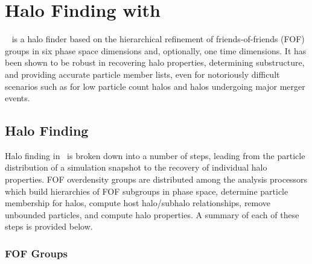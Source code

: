 
%
%

\section{Halo Finding with \rockstar}
\label{sec:rockstar}



\rockstar\ \citep[Robust Overdensity Calculation using K-Space Topologically Adaptive Refinement; ][]{2013ApJ...762..109B} is a halo finder based on the hierarchical refinement of friends-of-friends (FOF) groups in six phase space dimensions and, optionally, one time dimensions.  It has been shown \citep{2011MNRAS.415.2293K} to be robust in recovering halo properties, determining substructure, and providing accurate particle member lists, even for notoriously difficult scenarios such as for low particle count halos and halos undergoing major merger events.




\subsection{Halo Finding}
\label{subsec:rockstar--halo_finding}


Halo finding in \rockstar\ is broken down into a number of steps, leading from the particle distribution of a simulation snapshot to the recovery of individual halo properties.  FOF overdensity groups are distributed among the analysis processors which build hierarchies of FOF subgroups in phase space, determine particle membership for halos, compute host halo/subhalo relationships, remove unbounded particles, and compute halo properties.  A summary of each of these steps is provided below.



\subsubsection{FOF Groups}
\label{subsubsec:rockstar--halo_finding--fof_groups}


